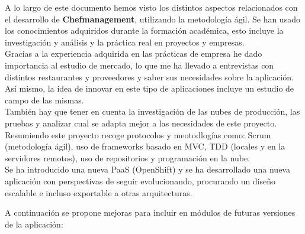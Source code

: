
A lo largo de este documento hemos visto los distintos aspectos relacionados con el desarrollo de \textbf{Chefmanagement}, utilizando la metodología ágil. Se han usado los conocimientos adquiridos durante la formación académica, esto incluye la investigación y análisis y la práctica real en proyectos y empresas. \\

Gracias a la experiencia adquirida en las prácticas de empresa he dado importancia al estudio de mercado, lo que me ha llevado a entrevistas con distintos restaurantes y proveedores y saber sus necesidades sobre la aplicación. Así mismo, la idea de innovar en este tipo de aplicaciones incluye un estudio de campo de las mismas. \\

También hay que tener en cuenta la investigación de las nubes de producción, las pruebas y analizar cual se adapta mejor a las necesidades de este proyecto. \\

Resumiendo este proyecto recoge protocolos y meotodlogías como: Scrum (metodología ágil), uso de frameworks basado en MVC, TDD (locales y en la servidores remotos), uso de repositorios y programación en la nube. \\

Se ha introducido una nueva PaaS (OpenShift) y se ha desarrollado una nueva aplicación con perspectivas de seguir evolucionando, procurando un diseño escalable e incluso exportable a otras arquitecturas.

\newpage

A continuación se propone mejoras para incluir en módulos de futuras versiones de la aplicación:

